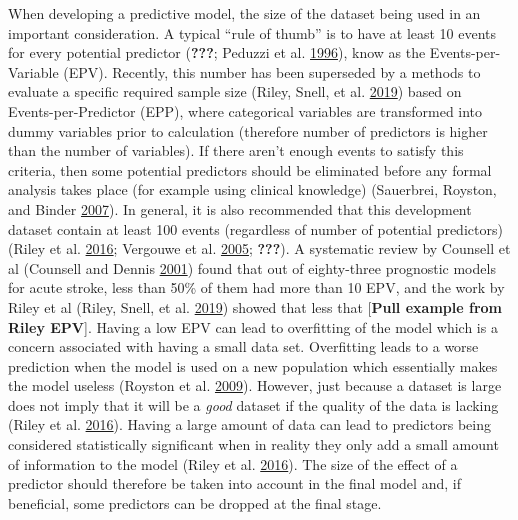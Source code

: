 \documentclass[
]{article}
\begin{document}
When developing a predictive model, the size of the dataset being used in an important consideration. A typical ``rule of thumb'' is to have at least 10 events for every potential predictor ({\textbf{???}}; Peduzzi et al. \protect\hyperlink{ref-peduzzi_simulation_1996}{1996}), know as the Events-per-Variable (EPV). Recently, this number has been superseded by a methods to evaluate a specific required sample size (Riley, Snell, et al. \protect\hyperlink{ref-riley_minimum_2019}{2019}) based on Events-per-Predictor (EPP), where categorical variables are transformed into dummy variables prior to calculation (therefore number of predictors is higher than the number of variables). If there aren't enough events to satisfy this criteria, then some potential predictors should be eliminated before any formal analysis takes place (for example using clinical knowledge) (Sauerbrei, Royston, and Binder \protect\hyperlink{ref-sauerbrei_selection_2007}{2007}). In general, it is also recommended that this development dataset contain at least 100 events (regardless of number of potential predictors) (Riley et al. \protect\hyperlink{ref-riley_external_2016}{2016}; Vergouwe et al. \protect\hyperlink{ref-vergouwe_substantial_2005}{2005}; {\textbf{???}}). A systematic review by Counsell et al (Counsell and Dennis \protect\hyperlink{ref-counsell_systematic_2001}{2001}) found that out of eighty-three prognostic models for acute stroke, less than 50\% of them had more than 10 EPV, and the work by Riley et al (Riley, Snell, et al. \protect\hyperlink{ref-riley_minimum_2019}{2019}) showed that less that {[}\textbf{Pull example from Riley EPV}{]}. Having a low EPV can lead to overfitting of the model which is a concern associated with having a small data set. Overfitting leads to a worse prediction when the model is used on a new population which essentially makes the model useless (Royston et al. \protect\hyperlink{ref-royston_prognosis_2009}{2009}). However, just because a dataset is large does not imply that it will be a \emph{good} dataset if the quality of the data is lacking (Riley et al. \protect\hyperlink{ref-riley_external_2016}{2016}). Having a large amount of data can lead to predictors being considered statistically significant when in reality they only add a small amount of information to the model (Riley et al. \protect\hyperlink{ref-riley_external_2016}{2016}). The size of the effect of a predictor should therefore be taken into account in the final model and, if beneficial, some predictors can be dropped at the final stage.
\end{document}
